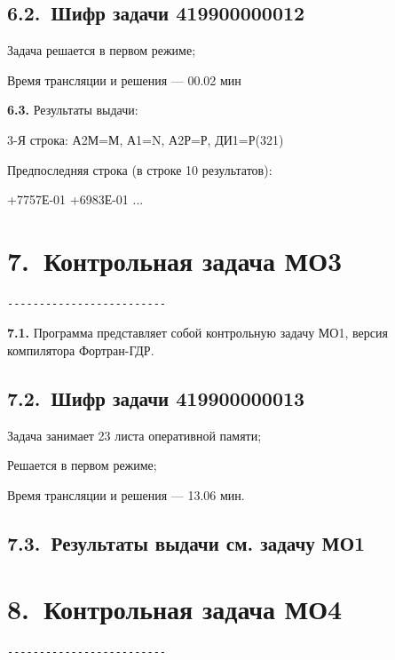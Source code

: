 \documentclass[11pt,a4paper]{article}
\begin{document}
\subsection*{6.2.~Шифр задачи 419900000012}
Задача решается в первом режиме;

Время трансляции и решения --- 00.02 мин

\par\textbf{6.3.} Результаты выдачи:\par
3-Я строка: А2М=М, А1=N, А2Р=Р, ДИ1=Р(321)

Предпоследняя строка (в строке 10 результатов):

+7757Е-01 +6983Е-01 ...

\section*{7.~Контрольная задача МО3}
\begin{center}\small
\begin{BVerbatim}
-------------------------
\end{BVerbatim}
\end{center}

\par\textbf{7.1.} Программа представляет собой контрольную задачу МО1, версия компилятора Фортран-ГДР.\par
\subsection*{7.2.~Шифр задачи 419900000013}
Задача занимает 23 листа оперативной памяти;

Решается в первом режиме;

Время трансляции и решения --- 13.06 мин.

\subsection*{7.3.~Результаты выдачи см. задачу МО1}
\section*{8.~Контрольная задача МО4}
\begin{center}\small
\begin{BVerbatim}
-------------------------
\end{BVerbatim}
\end{center}
\end{document}
